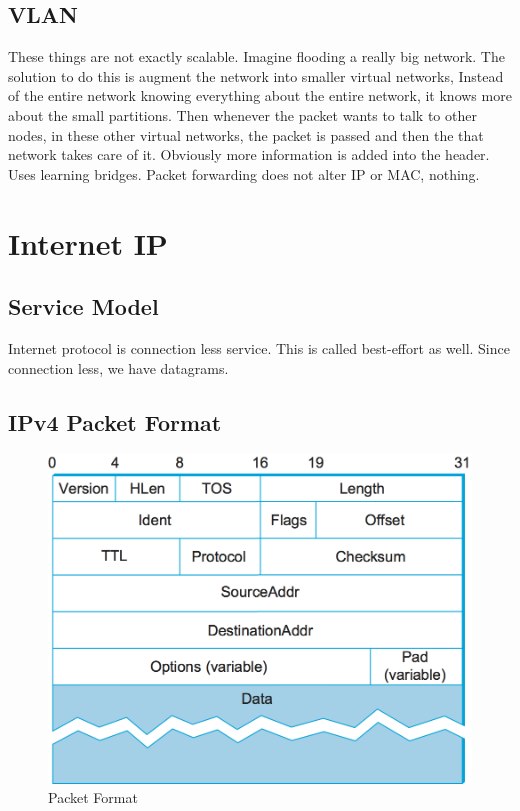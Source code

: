\documentclass[12pt]{book}
\begin{document}
\subsection{VLAN}
These things are not exactly scalable. Imagine flooding a really big network. The solution to do this is augment the network into smaller virtual networks, Instead of the entire network knowing everything about the entire network, it knows more about the small partitions. Then whenever the packet wants to talk to other nodes, in these other virtual networks, the packet is passed and then the that network takes care of it. Obviously more information is added into the header. Uses learning bridges. Packet forwarding does not alter IP or MAC, nothing.

\section{Internet IP}
\subsection{Service Model}
Internet protocol is connection less service. This is called best-effort as well. Since connection less, we have datagrams.

\subsection{IPv4 Packet Format}
\begin{figure}[H]
    \centering
    \includegraphics[width = \textwidth]{Pictures/ipv4.png}
    \caption{Packet Format}
    \label{fig:my_label}
\end{figure}
\end{document}

